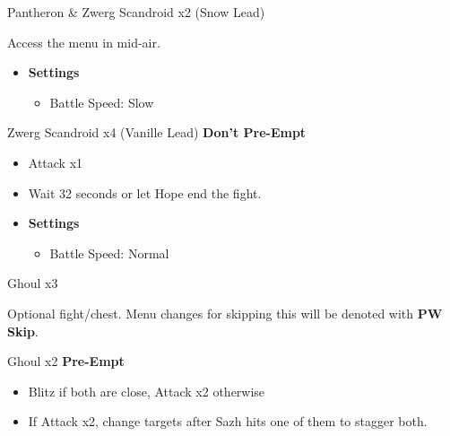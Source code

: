 \begin{multicols}{2}

\begin{battle}{Pantheron \& Zwerg Scandroid x2 (Snow Lead)}
\end{battle}
Access the menu in mid-air.

\begin{menu}
\begin{itemize}
    \item \textbf{Settings}
    \begin{itemize}
        \item Battle Speed: Slow
    \end{itemize}
\end{itemize}
\end{menu}

\begin{battle}{Zwerg Scandroid x4 (Vanille Lead) \textbf{Don't Pre-Empt}}
\begin{itemize}
    \item Attack x1
    \item Wait 32 seconds or let Hope end the fight.
\end{itemize}
\end{battle}

\begin{menu}
\begin{itemize}
    \item \textbf{Settings}
    \begin{itemize}
        \item Battle Speed: Normal
    \end{itemize}
\end{itemize}
\end{menu}

\begin{battle}{Ghoul x3}
\end{battle}

Optional fight/chest. Menu changes for skipping this will be denoted with {\bf PW Skip}.
\begin{battle}{Ghoul x2 \textbf{Pre-Empt}}
\begin{itemize}
    \item Blitz if both are close, Attack x2 otherwise
    \item If Attack x2, change targets after Sazh hits one of them to stagger both.
\end{itemize}
\end{battle}


\end{multicols}
